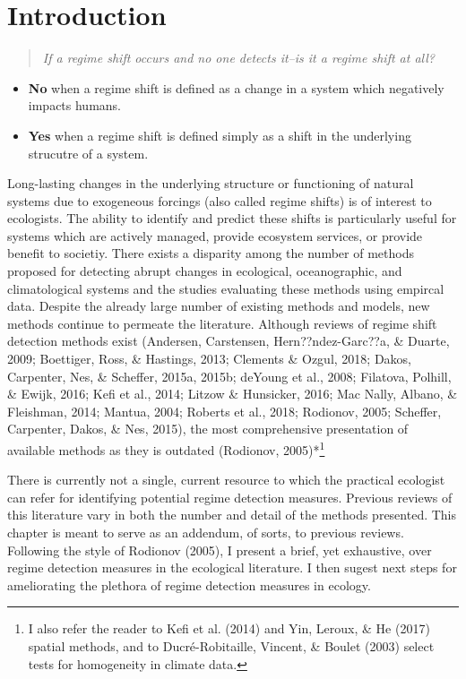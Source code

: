 \documentclass[12pt,twoside,openany]{reedthesis}
\providecommand{\tightlist}{%
  \setlength{\itemsep}{0pt}\setlength{\parskip}{0pt}}
\begin{document}
\section{Introduction}\label{introduction}
\begin{quote}
\emph{If a regime shift occurs and no one detects it--is it a regime
shift at all?}
\end{quote}
\begin{itemize}
\tightlist
\item
  \textbf{No} when a regime shift is defined as a change in a system
  which negatively impacts humans.
\item
  \textbf{Yes} when a regime shift is defined simply as a shift in the
  underlying strucutre of a system.
\end{itemize}
Long-lasting changes in the underlying structure or functioning of
natural systems due to exogeneous forcings (also called regime shifts)
is of interest to ecologists. The ability to identify and predict these
shifts is particularly useful for systems which are actively managed,
provide ecosystem services, or provide benefit to societiy. There exists
a disparity among the number of methods proposed for detecting abrupt
changes in ecological, oceanographic, and climatological systems and the
studies evaluating these methods using empircal data. Despite the
already large number of existing methods and models, new methods
continue to permeate the literature. Although reviews of regime shift
detection methods exist (Andersen, Carstensen, Hern??ndez-Garc??a, \&
Duarte, 2009; Boettiger, Ross, \& Hastings, 2013; Clements \& Ozgul,
2018; Dakos, Carpenter, Nes, \& Scheffer, 2015a, 2015b; deYoung et al.,
2008; Filatova, Polhill, \& Ewijk, 2016; Kefi et al., 2014; Litzow \&
Hunsicker, 2016; Mac Nally, Albano, \& Fleishman, 2014; Mantua, 2004;
Roberts et al., 2018; Rodionov, 2005; Scheffer, Carpenter, Dakos, \&
Nes, 2015), the most comprehensive presentation of available methods as
they is outdated (Rodionov, 2005)*\footnote{I also refer the reader to
  Kefi et al. (2014) and Yin, Leroux, \& He (2017) spatial methods, and
  to Ducré-Robitaille, Vincent, \& Boulet (2003) select tests for
  homogeneity in climate data.}

There is currently not a single, current resource to which the practical
ecologist can refer for identifying potential regime detection measures.
Previous reviews of this literature vary in both the number and detail
of the methods presented. This chapter is meant to serve as an addendum,
of sorts, to previous reviews. Following the style of Rodionov (2005), I
present a brief, yet exhaustive, over regime detection measures in the
ecological literature. I then sugest next steps for ameliorating the
plethora of regime detection measures in ecology.
\end{document}
